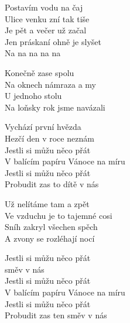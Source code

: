 
\ve{}
Postavím vodu na čaj\\
Ulice venku zní tak tiše\\
Je pět a večer už začal\\
Jen práskaní ohně je slyšet\\
Na na na na na

\ve{}
Konečně zase spolu\\
Na oknech námraza a my\\
U jednoho stolu\\
Na loňsky rok jsme navázali

\cho{}
Vychází první hvězda\\
Hezčí den v roce neznám\\
Jestli si můžu něco přát\\
V balícím papíru Vánoce na míru\\
Jestli si můžu něco přát\\
Probudit zas to dítě v nás

\ve{}
Už nelítáme tam a zpět\\
Ve vzduchu je to tajemné cosi\\
Sníh zakryl všechen spěch\\
A zvony se rozléhají nocí

\cho{}

\cho{}
Jestli si můžu něco přát\\
směv v nás\\
Jestli si můžu něco přát\\
V balícím papíru Vánoce na míru\\
Jestli si můžu něco přát\\
Probudit zas ten směv v nás

\esong{}
